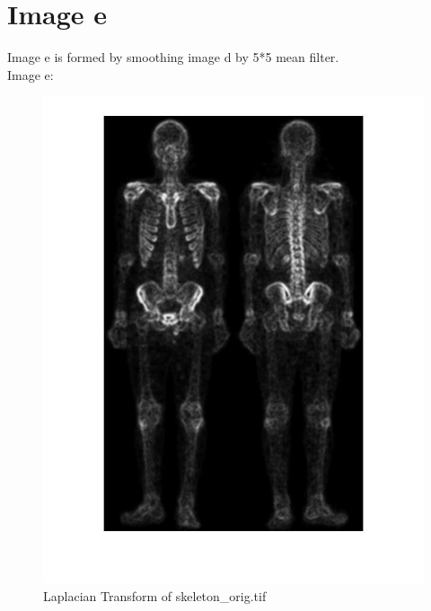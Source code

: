 \documentclass[11pt,oneside]{book}
\begin{document}
\section{Image e}
Image e is formed by smoothing image d by 5*5 mean filter.\\
Image e:
\begin{figure}[!htb]
   \centering  
   \includegraphics[width=1.0\textwidth]{images/2/e.jpg}
   \caption{Laplacian Transform of skeleton\_orig.tif}  
\end{figure}
\end{document}

